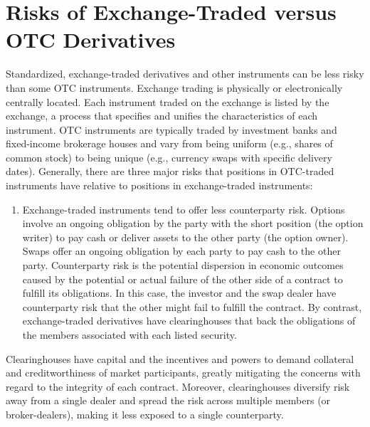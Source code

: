 \documentclass[11pt]{article}
\begin{document}
\section*{Risks of Exchange-Traded versus OTC Derivatives}
Standardized, exchange-traded derivatives and other instruments can be less risky than some OTC instruments. Exchange trading is physically or electronically centrally located. Each instrument traded on the exchange is listed by the exchange, a process that specifies and unifies the characteristics of each instrument. OTC instruments are typically traded by investment banks and fixed-income brokerage houses and vary from being uniform (e.g., shares of common stock) to being unique (e.g., currency swaps with specific delivery dates). Generally, there are three major risks that positions in OTC-traded instruments have relative to positions in exchange-traded instruments:

\begin{enumerate}
  \item Exchange-traded instruments tend to offer less counterparty risk. Options involve an ongoing obligation by the party with the short position (the option writer) to pay cash or deliver assets to the other party (the option owner). Swaps offer an ongoing obligation by each party to pay cash to the other party. Counterparty risk is the potential dispersion in economic outcomes caused by the potential or actual failure of the other side of a contract to fulfill its obligations. In this case, the investor and the swap dealer have counterparty risk that the other might fail to fulfill the contract. By contrast, exchange-traded derivatives have clearinghouses that back the obligations of the members associated with each listed security.
\end{enumerate}

Clearinghouses have capital and the incentives and powers to demand collateral and creditworthiness of market participants, greatly mitigating the concerns with regard to the integrity of each contract. Moreover, clearinghouses diversify risk away from a single dealer and spread the risk across multiple members (or broker-dealers), making it less exposed to a single counterparty.
\end{document}
